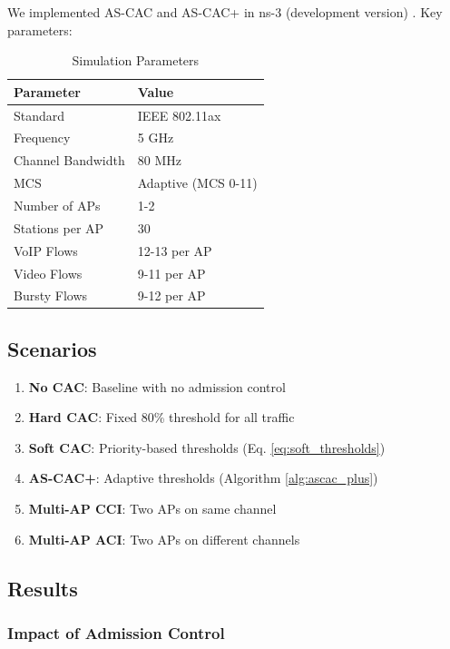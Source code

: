 \documentclass[conference]{IEEEtran}
\begin{document}
We implemented AS-CAC and AS-CAC+ in ns-3 (development version) \cite{14}. Key parameters:

\begin{table}[h]
\centering
\caption{Simulation Parameters}
\label{tab:params}
\begin{tabular}{ll}
\toprule
\textbf{Parameter} & \textbf{Value} \\
\midrule
Standard & IEEE 802.11ax \\
Frequency & 5 GHz \\
Channel Bandwidth & 80 MHz \\
MCS & Adaptive (MCS 0-11) \\
Number of APs & 1-2 \\
Stations per AP & 30 \\
VoIP Flows & 12-13 per AP \\
Video Flows & 9-11 per AP \\
Bursty Flows & 9-12 per AP \\
\bottomrule
\end{tabular}
\end{table}

\subsection{Scenarios}

\begin{enumerate}
    \item \textbf{No CAC}: Baseline with no admission control
    \item \textbf{Hard CAC}: Fixed 80\% threshold for all traffic
    \item \textbf{Soft CAC}: Priority-based thresholds (Eq. \ref{eq:soft_thresholds})
    \item \textbf{AS-CAC+}: Adaptive thresholds (Algorithm \ref{alg:ascac_plus})
    \item \textbf{Multi-AP CCI}: Two APs on same channel
    \item \textbf{Multi-AP ACI}: Two APs on different channels
\end{enumerate}

\subsection{Results}



\subsubsection{Impact of Admission Control}
\end{document}
